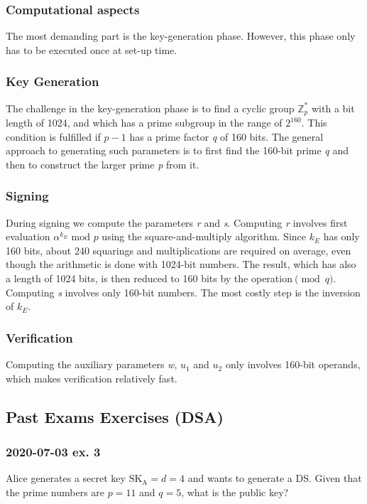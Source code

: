 \documentclass[11pt, a4paper]{article}
\newcommand{\mymod}{
    \text{ mod }
}
\begin{document}
\subsubsection{Computational aspects}
The most demanding part is the key-generation phase. However, this phase only has to be executed once at set-up time.

\subsubsection*{Key Generation}
The challenge in the key-generation phase is to find a cyclic group $\mathbb{Z}_p^*$ with a bit length of 1024, and which has a prime subgroup in the range of $2^{160}$. This condition is fulfilled if $p-1$ has a prime factor \textit{q} of 160 bits. The general approach to generating such parameters is to first find the 160-bit prime \textit{q} and then to construct the larger prime \textit{p} from it.

\subsubsection*{Signing}
During signing we compute the parameters \textit{r} and \textit{s}. Computing \textit{r} involves first evaluation $\alpha^{k_E}\mymod p$ using the square-and-multiply algorithm. Since $k_E$ has only 160 bits, about 240 squarings and multiplications are required on average, even though the arithmetic is done with 1024-bit numbers. The result, which has also a length of 1024 bits, is then reduced to 160 bits by the operation$\pmod q$. Computing \textit{s} involves only 160-bit numbers. The most costly step is the inversion of $k_E$.

\subsubsection*{Verification}
Computing the auxiliary parameters \textit{w}, $u_1$ and $u_2$ only involves 160-bit operands, which makes verification relatively fast.

\newpage
\subsection{Past Exams Exercises (DSA)}
\subsubsection{2020-07-03 ex. 3}
Alice generates a secret key $\text{SK}_{\text{A}}=d=4$ and wants to generate a DS. Given that the prime numbers are $p=11$ and $q=5$, what is the public key?
\end{document}
